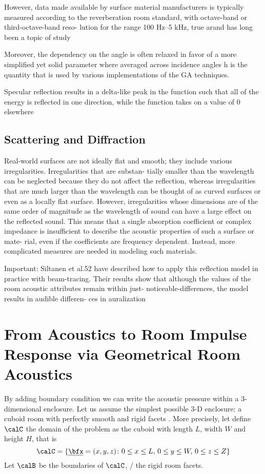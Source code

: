 However, data made available by surface material manufacturers is typically measured according to the reverberation room standard, with octave-band or third-octave-band reso- lution for the range 100 Hz–5 kHz,
true arand has long been a topic of study

Moreover, the dependency on the angle is often relaxed in favor of a more simplified yet solid parameter where
averaged across incidence angles h is the quantity that is used by various implementations of the GA techniques.


Specular reflection results in a delta-like peak in the function such that all of the energy is reflected in one direction, while the function takes on a value of 0 elsewhere


\subsection{Scattering and Diffraction}
Real-world surfaces are not ideally flat and smooth; they
include various irregularities. Irregularities that are substan- tially smaller than the wavelength can be neglected because they do not affect the reflection, whereas irregularities that are much larger than the wavelength can be thought of as curved surfaces or even as a locally flat surface. However, irregularities whose dimensions are of the same order of magnitude as the wavelength of sound can have a large effect on the reflected sound. This means that a single absorption coefficient or complex impedance is insufficient to describe the acoustic properties of such a surface or mate- rial, even if the coefficients are frequency dependent. Instead, more complicated measures are needed in modeling such materials.


Important:
Siltanen et al.52 have described how to apply this reflection model in practice with beam-tracing. Their results show that although the values of the room acoustic attributes remain within just- noticeable-differences, the model results in audible differen- ces in auralization


\section{From Acoustics to Room Impulse Response via Geometrical Room Acoustics}
By adding boundary condition we can write the acoustic pressure within a 3-dimensional enclosure.
Let us assume the simplest possible 3-D enclosure: a cuboid room with perfectly smooth and rigid facets
.
More precisely, let define $\calC$ the domain of the problem as the cuboid with length $L$, width $W$ and height $H$, that is
\begin{equation}
    \calC = \kset{\positionMicrophone = (x,y,z)}{
        0 \le x \le L,\,
        0 \le y \le W,\,
        0 \le z \le Z}
\end{equation}
Let $\calB$ be the boundaries of $\calC$, \ie/ the rigid room facets.

